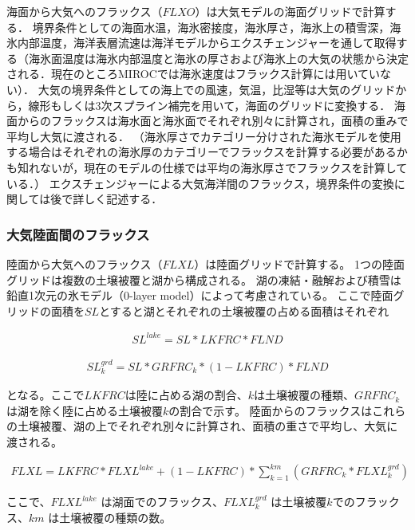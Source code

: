 海面から大気へのフラックス（\(FLXO\)）は大気モデルの海面グリッドで計算する．
境界条件としての海面水温，海氷密接度，海氷厚さ，海氷上の積雪深，海氷内部温度，海洋表層流速は海洋モデルからエクスチェンジャーを通して取得する（海氷面温度は海氷内部温度と海氷の厚さおよび海氷上の大気の状態から決定される．現在のところMIROCでは海氷速度はフラックス計算には用いていない）．
大気の境界条件としての海上での風速，気温，比湿等は大気のグリッドから，線形もしくは3次スプライン補完を用いて，海面のグリッドに変換する．
海面からのフラックスは海水面と海氷面でそれぞれ別々に計算され，面積の重みで平均し大気に渡される．
（海氷厚さでカテゴリー分けされた海氷モデルを使用する場合はそれぞれの海氷厚のカテゴリーでフラックスを計算する必要があるかも知れないが，現在のモデルの仕様では平均の海氷厚さでフラックスを計算している．）
エクスチェンジャーによる大気海洋間のフラックス，境界条件の変換に関しては後で詳しく記述する．

\hypertarget{ux5927ux6c17ux9678ux9762ux9593ux306eux30d5ux30e9ux30c3ux30afux30b9}{%
\subsubsection{大気陸面間のフラックス}\label{ux5927ux6c17ux9678ux9762ux9593ux306eux30d5ux30e9ux30c3ux30afux30b9}}

陸面から大気へのフラックス（\(FLXL\)）は陸面グリッドで計算する。
1つの陸面グリッドは複数の土壌被覆と湖から構成される。
湖の凍結・融解および積雪は鉛直1次元の氷モデル（0-layer
model）によって考慮されている。
ここで陸面グリッドの面積を\(SL\)とすると湖とそれぞれの土壌被覆の占める面積はそれぞれ

\begin{eqnarray} SL^{lake}=SL * LKFRC * FLND \end{eqnarray}

\begin{eqnarray} SL^{grd}_k = SL * GRFRC_k * (1-LKFRC) * FLND \end{eqnarray}

となる。ここで\(LKFRC\)は陸に占める湖の割合、\(k\)は土壌被覆の種類、\(GRFRC_k\)は湖を除く陸に占める土壌被覆\(k\)の割合で示す。
陸面からのフラックスはこれらの土壌被覆、湖の上でそれぞれ別々に計算され、面積の重さで平均し、大気に渡される。

\begin{eqnarray} FLXL = LKFRC * FLXL^{lake} + (1-LKFRC) * \sum_{k=1}^{km} (GRFRC_k * FLXL_k^{grd}) \end{eqnarray}

ここで、\(FLXL^{lake}\) は湖面でのフラックス、\(FLXL_{k}^{grd}\)
は土壌被覆\(k\)でのフラックス、\(km\) は土壌被覆の種類の数。

